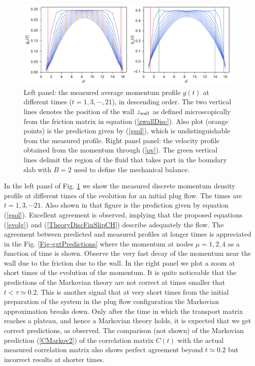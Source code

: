 \documentclass[b5paper,openright,10pt]{book}
\begin{document}
\begin{figure}[!h]
\includegraphics[width=\linewidth]{gxtPredictions_and_vtCorrected-17nodes-WALLS}
\caption[The momentum profile at different times and the velocity profile obtained from the momentum for a confined fluid - Thick bins]{Left panel: the measured average  momentum profile $g(t)$ at  different times
  ($t=1,3,\cdots,21$), in  descending order.   The two  vertical lines
  denotes  the  position  of  the   wall  $z_{\rm  wall}$  as  defined
  microscopically from the friction  matrix in equation  (\ref{zwallDisc}).
  Also  plot  (orange points) is  the  prediction  given  by  (\ref{gsol}),  which  is
  undistinguishable  from the  measured  profile.   Right panel panel: the velocity profile obtained from the momentum through (\ref{ov}). The green vertical lines delimit the region of the fluid that takes part in the boundary slab with $B=2$ used to define the mechanical balance.}
\label{Fig-gxt-vt}
\end{figure}

In  the left  panel  of  Fig.  \ref{Fig-gxt-vt}  we  show the  measured
discrete momentum density profile at  different times of the evolution
for an initial plug flow. The times are $t=1,3,\cdots 21$.  Also shown
in that figure is the prediction given by equation  (\ref{gsol}). Excellent
agreement   is  observed,   implying  that   the  proposed   equations
(\ref{evolg}) and (\ref{TheoryDiscFinSlipCH})  describe adequately the flow.
The agreement between predicted and  measured profiles at longer times
is   appreciated   in  the Fig.
\ref{Fig-gxtPredictions}   where  the   momentum   at   nodes  $\mu=1,2,4$  as a function of time is
shown. Observe the  very fast decay of the momentum  near the wall due
to the friction due to the wall. In the right panel we plot a zoom at
short times of the evolution of  the momentum.  It is quite noticeable
that the predictions of the Markovian  theory are not correct at times
smaller that $t<\tau\simeq 0.2$.  This  is another signal that at very
short times  from the initial  preparation of  the system in  the plug
flow configuration the Markovian approximation breaks down. Only after
the time in which the transport  matrix reaches a plateau, and hence a
Markovian  theory   holds,  it  is   expected  that  we   get  correct
predictions, as observed.  The comparison (not shown) of the Markovian
prediction (\ref{CMarkov2}) of the  correlation matrix $C(t)$ with the
actual measured correlation matrix also shows perfect agreement beyond
$t\simeq 0.2$ but incorrect results at shorter times.
\end{document}
